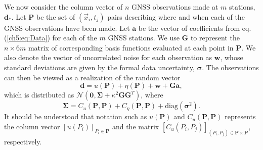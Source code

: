 We now consider the column vector of $n$ GNSS observations made at $m$
stations, $\mathbf{d}_*$. Let $\mathbf{P}$ be the set of $(\vec{x}_i,
t_j)$ pairs describing where and when each of the GNSS observations
have been made. Let $\mathbf{a}$ be the vector of coefficients from
eq. (\ref{ch5:eq:Data}) for each of the $m$ GNSS stations. We use
$\mathbf{G}$ to represent the $n \times 6m$ matrix of corresponding
basis functions evaluated at each point in $\mathbf{P}$. We also
denote the vector of uncorrelated noise for each observation as
$\mathbf{w}$, whose standard deviations are given by the formal data
uncertainty, $\mathbf{\sigma}$. The observations can then be viewed as
a realization of the random vector
\begin{equation}
\mathbf{d} = u(\mathbf{P}) + \eta(\mathbf{P}) + \mathbf{w} + \mathbf{G}\mathbf{a},
\end{equation}
which is distributed as $\mathcal{N}(\mathbf{0},\mathbf{\Sigma} +
\kappa^2\mathbf{G}\mathbf{G}^T)$, where
\begin{equation}\label{ch5:eq:Cd}
\mathbf{\Sigma} = C_u(\mathbf{P},\mathbf{P}) + C_\eta(\mathbf{P},\mathbf{P}) + 
              \mathrm{diag}\left(\mathbf{\sigma}^2\right).  
\end{equation}
It should be understood that notation such as $u(\mathbf{P})$ and
$C_u(\mathbf{P},\mathbf{P})$ represents the column vector
$[u(P_i)]_{P_i \in \mathbf{P}}$ and the matrix
$[C_u(P_i,P_j)]_{(P_i,P_j) \in \mathbf{P} \times \mathbf{P}}$,
respectively.

